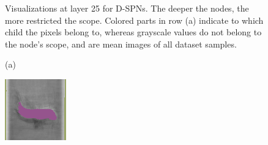 \documentclass{article}
\begin{document}
\begin{figure}[t]
\begin{minipage}[c]{.21\linewidth}
  \end{minipage}
  \caption{Visualizations at layer 25 for D-SPNs. The deeper the nodes, the more restricted the
    scope. Colored parts in row (a) indicate to which child the pixels belong to, whereas grayscale
    values do not belong to the node's scope, and are mean images of all dataset samples.
    \label{fig:d-cal-1}}
\end{figure}

\begin{figure}[!b]
  \centering
  \begin{minipage}[c]{.1\linewidth}
    \centering\centerline{(a)}
  \end{minipage}
  \begin{minipage}[c]{.21\linewidth}
    \centering\centerline{\includegraphics[width=\linewidth]{imgs/dennis_cal/airplane/products/497.png}}
  \end{minipage}
  \begin{minipage}[c]{.21\linewidth}

\end{minipage}
\end{figure}
\end{document}
